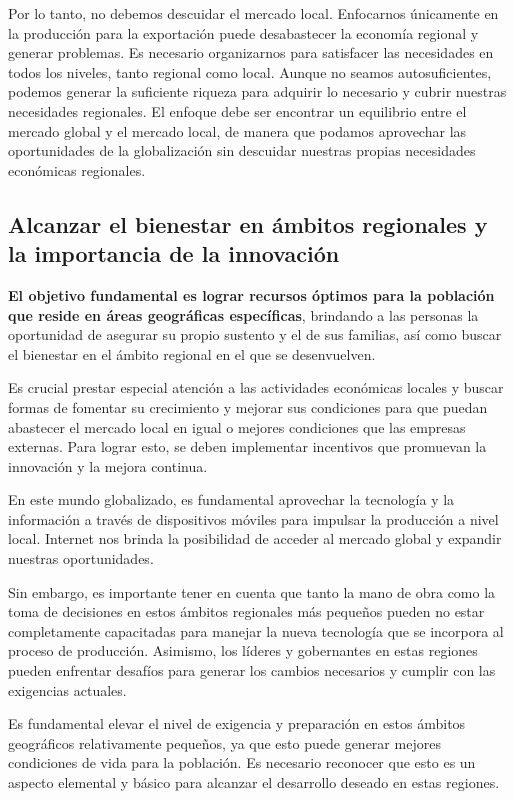 \documentclass[
  jou,
  floatsintext,
  longtable,
  a4paper,
  nolmodern,
  notxfonts,
  notimes,
  12pt,
  colorlinks=true,linkcolor=blue,citecolor=blue,urlcolor=blue]{apa7}
\begin{document}
Por lo tanto, no debemos descuidar el mercado local. Enfocarnos
únicamente en la producción para la exportación puede desabastecer la
economía regional y generar problemas. Es necesario organizarnos para
satisfacer las necesidades en todos los niveles, tanto regional como
local. Aunque no seamos autosuficientes, podemos generar la suficiente
riqueza para adquirir lo necesario y cubrir nuestras necesidades
regionales. El enfoque debe ser encontrar un equilibrio entre el mercado
global y el mercado local, de manera que podamos aprovechar las
oportunidades de la globalización sin descuidar nuestras propias
necesidades económicas regionales.

\subsection{Alcanzar el bienestar en ámbitos regionales y la importancia
de la
innovación}\label{alcanzar-el-bienestar-en-uxe1mbitos-regionales-y-la-importancia-de-la-innovaciuxf3n}

\textbf{El objetivo fundamental es lograr recursos óptimos para la
población que reside en áreas geográficas específicas}, brindando a las
personas la oportunidad de asegurar su propio sustento y el de sus
familias, así como buscar el bienestar en el ámbito regional en el que
se desenvuelven.

Es crucial prestar especial atención a las actividades económicas
locales y buscar formas de fomentar su crecimiento y mejorar sus
condiciones para que puedan abastecer el mercado local en igual o
mejores condiciones que las empresas externas. Para lograr esto, se
deben implementar incentivos que promuevan la innovación y la mejora
continua.

En este mundo globalizado, es fundamental aprovechar la tecnología y la
información a través de dispositivos móviles para impulsar la producción
a nivel local. Internet nos brinda la posibilidad de acceder al mercado
global y expandir nuestras oportunidades.

Sin embargo, es importante tener en cuenta que tanto la mano de obra
como la toma de decisiones en estos ámbitos regionales más pequeños
pueden no estar completamente capacitadas para manejar la nueva
tecnología que se incorpora al proceso de producción. Asimismo, los
líderes y gobernantes en estas regiones pueden enfrentar desafíos para
generar los cambios necesarios y cumplir con las exigencias actuales.

Es fundamental elevar el nivel de exigencia y preparación en estos
ámbitos geográficos relativamente pequeños, ya que esto puede generar
mejores condiciones de vida para la población. Es necesario reconocer
que esto es un aspecto elemental y básico para alcanzar el desarrollo
deseado en estas regiones.
\end{document}
